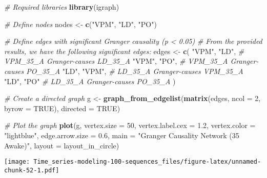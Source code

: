 \documentclass[
]{article}
\newenvironment{Shaded}{\begin{snugshade}}{\end{snugshade}}
\newcommand{\AttributeTok}[1]{\textcolor[rgb]{0.13,0.29,0.53}{#1}}
\newcommand{\CommentTok}[1]{\textcolor[rgb]{0.56,0.35,0.01}{\textit{#1}}}
\newcommand{\ConstantTok}[1]{\textcolor[rgb]{0.56,0.35,0.01}{#1}}
\newcommand{\DecValTok}[1]{\textcolor[rgb]{0.00,0.00,0.81}{#1}}
\newcommand{\FloatTok}[1]{\textcolor[rgb]{0.00,0.00,0.81}{#1}}
\newcommand{\FunctionTok}[1]{\textcolor[rgb]{0.13,0.29,0.53}{\textbf{#1}}}
\newcommand{\NormalTok}[1]{#1}
\newcommand{\OtherTok}[1]{\textcolor[rgb]{0.56,0.35,0.01}{#1}}
\newcommand{\StringTok}[1]{\textcolor[rgb]{0.31,0.60,0.02}{#1}}
\begin{document}
\begin{Shaded}
\begin{Highlighting}[]
\CommentTok{\# Required libraries}
\FunctionTok{library}\NormalTok{(igraph)}

\CommentTok{\# Define nodes}
\NormalTok{nodes }\OtherTok{\textless{}{-}} \FunctionTok{c}\NormalTok{(}\StringTok{"VPM"}\NormalTok{, }\StringTok{"LD"}\NormalTok{, }\StringTok{"PO"}\NormalTok{)}

\CommentTok{\# Define edges with significant Granger causality (p \textless{} 0.05)}
\CommentTok{\# From the provided results, we have the following significant edges:}
\NormalTok{edges }\OtherTok{\textless{}{-}} \FunctionTok{c}\NormalTok{(}
  \StringTok{"VPM"}\NormalTok{, }\StringTok{"LD"}\NormalTok{,  }\CommentTok{\# VPM\_35\_A Granger{-}causes LD\_35\_A}
  \StringTok{"VPM"}\NormalTok{, }\StringTok{"PO"}\NormalTok{,  }\CommentTok{\# VPM\_35\_A Granger{-}causes PO\_35\_A}
  \StringTok{"LD"}\NormalTok{, }\StringTok{"VPM"}\NormalTok{,  }\CommentTok{\# LD\_35\_A Granger{-}causes VPM\_35\_A}
  \StringTok{"LD"}\NormalTok{, }\StringTok{"PO"}   \CommentTok{\# LD\_35\_A Granger{-}causes PO\_35\_A}
\NormalTok{)}

\CommentTok{\# Create a directed graph}
\NormalTok{g }\OtherTok{\textless{}{-}} \FunctionTok{graph\_from\_edgelist}\NormalTok{(}\FunctionTok{matrix}\NormalTok{(edges, }\AttributeTok{ncol =} \DecValTok{2}\NormalTok{, }\AttributeTok{byrow =} \ConstantTok{TRUE}\NormalTok{), }\AttributeTok{directed =} \ConstantTok{TRUE}\NormalTok{)}

\CommentTok{\# Plot the graph}
\FunctionTok{plot}\NormalTok{(g,}
     \AttributeTok{vertex.size =} \DecValTok{50}\NormalTok{,}
     \AttributeTok{vertex.label.cex =} \FloatTok{1.2}\NormalTok{,}
     \AttributeTok{vertex.color =} \StringTok{"lightblue"}\NormalTok{,}
     \AttributeTok{edge.arrow.size =} \FloatTok{0.6}\NormalTok{,}
     \AttributeTok{main =} \StringTok{"Granger Causality Network (35 Awake)"}\NormalTok{,}
     \AttributeTok{layout =}\NormalTok{ layout\_in\_circle)}
\end{Highlighting}
\end{Shaded}

\texttt{[image: Time\_series-modeling-100-sequences\_files/figure-latex/unnamed-chunk-52-1.pdf]}
\end{document}
